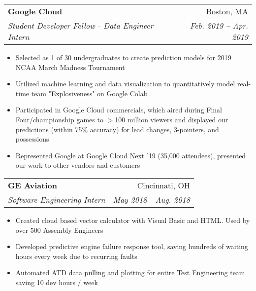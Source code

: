 \documentclass[letterpaper,11pt]{article}
\makeatletter
\newcommand{\resumeSubheading}[4]{
  \vspace{-1pt}\item[]
    \begin{tabular*}{0.97\textwidth}{l@{\extracolsep{\fill}}r}
      \textbf{#1} & #2 \\
      \textit{\small#3} & \textit{\small #4} \\
    \end{tabular*}\vspace{-5pt}
}
\makeatother
\begin{document}
    \resumeSubheading
      {\small Google Cloud}{\small Boston, MA}
       {\small Student Developer Fellow - Data Engineer Intern}{\small Feb. 2019 -- Apr. 2019}
       {\begin{itemize}
            \small\vspace{0mm} \item Selected as 1 of 30 undergraduates to create prediction models for 2019 NCAA March Madness Tournament
            \small \item Utilized machine learning and data visualization to quantitatively model real-time team "Explosiveness" on Google Colab
            \small \item Participated in Google Cloud commercials, which aired during Final Four/championship games to $>$100 million viewers and displayed our predictions (within 75\% accuracy) for lead changes, 3-pointers, and possessions
            \small\item Represented Google at Google Cloud Next '19 (35,000 attendees), presented our work to other vendors and customers
        \end{itemize}}
        \vspace{-2.5mm}

    \resumeSubheading
      {\small GE Aviation}{\small Cincinnati, OH}
      {\small Software Engineering Intern}{\small May 2018 - Aug. 2018}
      {\begin{itemize}
            \small\vspace{0mm} \item Created cloud based vector calculator with Visual Basic and HTML. Used by over 500 Assembly Engineers
            \small \item Developed predictive engine failure response tool, saving hundreds of  waiting hours every week due to recurring faults
            \small \item Automated ATD data pulling and plotting for entire Test Engineering team saving 10 dev hours / week
        \end{itemize}}
        \vspace{-2.5mm}
\end{document}
